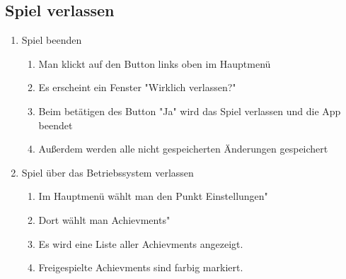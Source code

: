 \documentclass{scrartcl}
\begin{document}
\subsection{Spiel verlassen}
	\begin{enumerate}
		\item Spiel beenden
			\begin{enumerate}
				\item Man klickt auf den Button links oben im Hauptmenü
				\item Es erscheint ein Fenster "Wirklich verlassen?"
				\item Beim betätigen des Button "Ja" wird das Spiel verlassen und die App beendet
				\item Außerdem werden alle nicht gespeicherten Änderungen gespeichert
			\end{enumerate}
		\item Spiel über das Betriebssystem verlassen
			\begin{enumerate}
				\item Im Hauptmenü wählt man den Punkt \grqq Einstellungen"
				\item Dort wählt man \grqq Achievments"
				\item Es wird eine Liste aller Achievments angezeigt.
				\item Freigespielte Achievments sind farbig markiert. 
			\end{enumerate}
	\end{enumerate}
\end{document}
